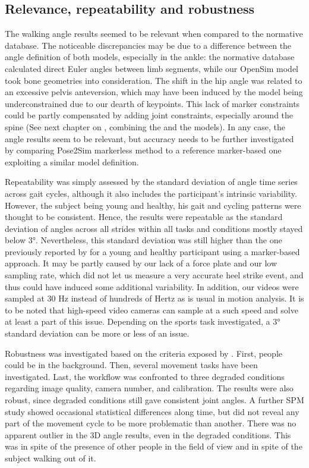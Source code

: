 \subsection{Relevance, repeatability and robustness}

The walking angle results seemed to be relevant when compared to the normative database. The noticeable discrepancies may be due to a difference between the angle definition of both models, especially in the ankle: the normative database calculated direct Euler angles between limb segments, while our OpenSim model took bone geometries into consideration. The shift in the hip angle was related to an excessive pelvis anteversion, which may have been induced by the model being underconstrained due to our dearth of keypoints. This lack of marker constraints could be partly compensated by adding joint constraints, especially around the spine (See next chapter on , combining the \cite{Rajagopal2016} and the \cite{Beaucage-Gauvreau2019} models). In any case, the angle results seem to be relevant, but accuracy needs to be further investigated by comparing Pose2Sim markerless method to a reference marker-based one exploiting a similar model definition.

Repeatability was simply assessed by the standard deviation of angle time series across gait cycles, although it also includes the participant’s intrinsic variability. However, the subject being young and healthy, his gait and cycling patterns were thought to be consistent. Hence, the results were repeatable as the standard deviation of angles across all strides within all tasks and conditions mostly stayed below 3°. Nevertheless, this standard deviation was still higher than the one previously reported by \cite{Kang2008} for a young and healthy participant using a marker-based approach. It may be partly caused by our lack of a force plate and our low sampling rate, which did not let us measure a very accurate heel strike event, and thus could have induced some additional variability. In addition, our videos were sampled at 30 Hz instead of hundreds of Hertz as is usual in motion analysis. It is to be noted that high-speed video cameras can sample at a such speed and solve at least a part of this issue. Depending on the sports task investigated, a 3° standard deviation can be more or less of an issue.

Robustness was investigated based on the criteria exposed by \cite{Moeslund2001}. First, people could be in the background. Then, several movement tasks have been investigated. Last, the workflow was confronted to three degraded conditions regarding image quality, camera number, and calibration. The results were also robust, since degraded conditions still gave consistent joint angles. A further SPM study showed occasional statistical differences along time, but did not reveal any part of the movement cycle to be more problematic than another. There was no apparent outlier in the 3D angle results, even in the degraded conditions. This was in spite of the presence of other people in the field of view and in spite of the subject walking out of it.


